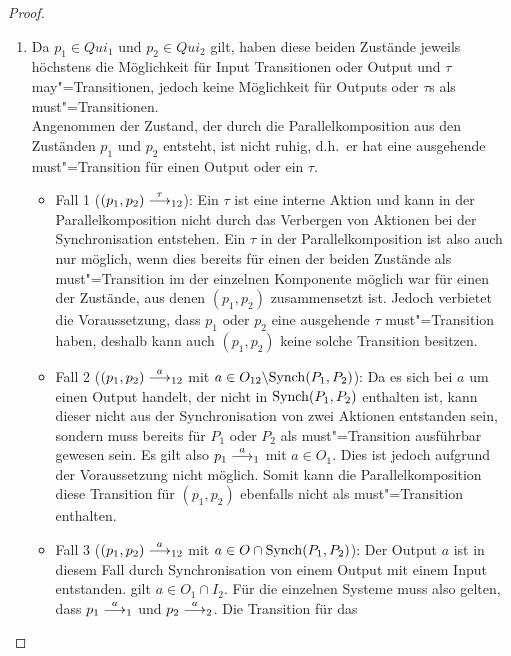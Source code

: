 \begin{proof}\mbox{}
  \begin{enumerate}
    \item Da $p_1\in Qui_1$ und $p_2\in Qui_2$ gilt, haben diese beiden
      Zustände jeweils höchstens die Möglichkeit für Input Transitionen oder
      Output und $\tau$ may"=Transitionen, jedoch keine Möglichkeit für Outputs
      oder $\tau$s als must"=Transitionen.\\
      Angenommen der Zustand, der durch die Parallelkomposition aus den
      Zuständen $p_1$ und $p_2$ entsteht, ist nicht ruhig, d.h.\ er hat eine
      ausgehende must"=Transition für einen Output oder ein $\tau$.
      \begin{itemize}
        \item Fall 1 \big($(p_1,p_2)\must[\tau]_{12}$\big): Ein $\tau$ ist eine
          interne Aktion und kann in der Parallelkomposition nicht durch das
          Verbergen von Aktionen bei der Synchronisation entstehen. Ein $\tau$
          in der Parallelkomposition ist also auch nur möglich, wenn dies
          bereits für einen der beiden Zustände als must"=Transition im der
          einzelnen Komponente möglich war für einen der Zustände, aus denen
          $(p_1,p_2)$ zusammensetzt ist. Jedoch verbietet die Voraussetzung,
          dass $p_1$ oder $p_2$ eine ausgehende $\tau$ must"=Transition haben,
          deshalb kann auch $(p_1,p_2)$ keine solche Transition besitzen.
        \item Fall 2 \big($(p_1,p_2)\must[a]_{12}$ mit $a\in O_{12}\backslash
          \mathrm{Synch}(P_1,P_2)$\big): Da es sich bei $a$ um einen Output handelt, der
          nicht in $\mathrm{Synch} (P_1,P_2)$ enthalten ist, kann dieser nicht aus der
          Synchronisation von zwei Aktionen entstanden sein, sondern muss
          bereits für $P_1$ oder $P_2$ als must"=Transition ausführbar gewesen
          sein. Es gilt also \oBdA{} $p_1\must[a]_1$ mit $a\in O_1$. Dies ist
          jedoch aufgrund der Voraussetzung nicht möglich. Somit kann die
          Parallelkomposition diese Transition für $(p_1,p_2)$ ebenfalls nicht
          als must"=Transition enthalten.
        \item Fall 3 \big($(p_1,p_2)\must[a]_{12}$ mit $a\in O\cap\mathrm{Synch}
          (P_1,P_2)$\big): Der Output $a$ ist in diesem Fall durch
          Synchronisation von einem Output mit einem Input entstanden. \OBdA{}
          gilt $a\in O_1\cap I_2$. Für die einzelnen Systeme muss also gelten,
          dass $p_1\must[a]_1$ und $p_2\must[a]_2$. Die Transition für das

\end{itemize}
\end{enumerate}
\end{proof}
